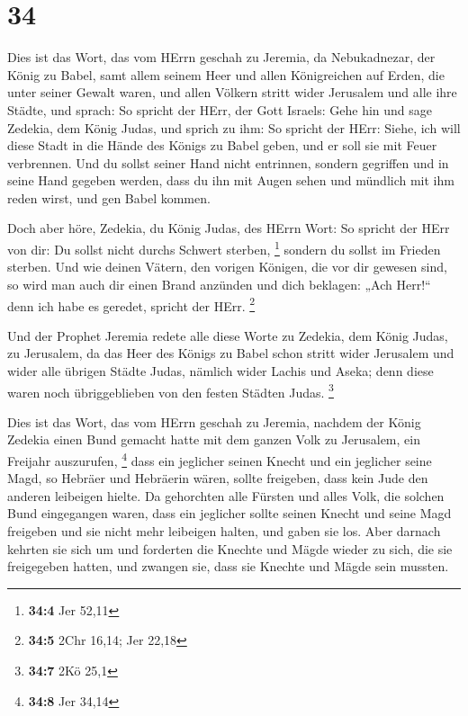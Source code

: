 \hypertarget{section-8}{%
\section{34}\label{section-8}}

 Dies ist das Wort, das vom HErrn geschah zu Jeremia, da
Nebukadnezar, der König zu Babel, samt allem seinem Heer und allen
Königreichen auf Erden, die unter seiner Gewalt waren, und allen Völkern
stritt wider Jerusalem und alle ihre Städte, und sprach:  So
spricht der HErr, der Gott Israels: Gehe hin und sage Zedekia, dem König
Judas, und sprich zu ihm: So spricht der HErr: Siehe, ich will diese
Stadt in die Hände des Königs zu Babel geben, und er soll sie mit Feuer
verbrennen.  Und du sollst seiner Hand nicht entrinnen,
sondern gegriffen und in seine Hand gegeben werden, dass du ihn mit
Augen sehen und mündlich mit ihm reden wirst, und gen Babel kommen.

 Doch aber höre, Zedekia, du König Judas, des HErrn Wort: So
spricht der HErr von dir: Du sollst nicht durchs Schwert sterben,
\footnote{\textbf{34:4} Jer 52,11}  sondern du sollst im
Frieden sterben. Und wie deinen Vätern, den vorigen Königen, die vor dir
gewesen sind, so wird man auch dir einen Brand anzünden und dich
beklagen: „Ach Herr!{}`` denn ich habe es geredet, spricht der HErr.
\footnote{\textbf{34:5} 2Chr 16,14; Jer 22,18}

 Und der Prophet Jeremia redete alle diese Worte zu Zedekia,
dem König Judas, zu Jerusalem,  da das Heer des Königs zu
Babel schon stritt wider Jerusalem und wider alle übrigen Städte Judas,
nämlich wider Lachis und Aseka; denn diese waren noch übriggeblieben von
den festen Städten Judas. \footnote{\textbf{34:7} 2Kö 25,1}

 Dies ist das Wort, das vom HErrn geschah zu Jeremia,
nachdem der König Zedekia einen Bund gemacht hatte mit dem ganzen Volk
zu Jerusalem, ein Freijahr auszurufen, \footnote{\textbf{34:8} Jer 34,14}
 dass ein jeglicher seinen Knecht und ein jeglicher seine
Magd, so Hebräer und Hebräerin wären, sollte freigeben, dass kein Jude
den anderen leibeigen hielte.  Da gehorchten alle Fürsten
und alles Volk, die solchen Bund eingegangen waren, dass ein jeglicher
sollte seinen Knecht und seine Magd freigeben und sie nicht mehr
leibeigen halten, und gaben sie los.  Aber darnach kehrten
sie sich um und forderten die Knechte und Mägde wieder zu sich, die sie
freigegeben hatten, und zwangen sie, dass sie Knechte und Mägde sein
mussten.

